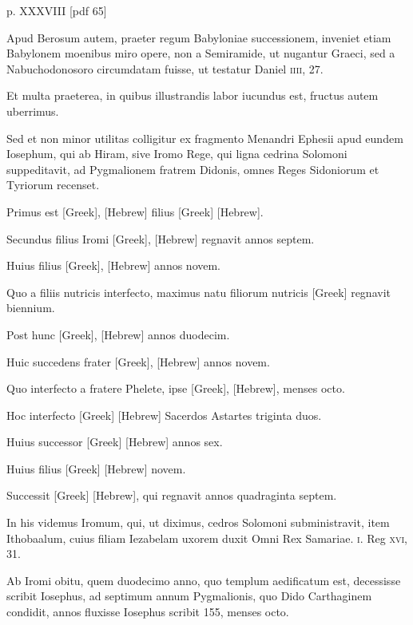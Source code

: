 \begin{parnumbers}
\clearpage
p. XXXVIII [pdf 65]

Apud Berosum autem, praeter
regum Babyloniae successionem, inveniet etiam Babylonem moenibus
miro opere, non a Semiramide, ut nugantur Graeci, sed a Nabuchodonosoro
circumdatam fuisse, ut testatur Daniel \textsc{iiii}, 27.

Et
multa praeterea, in quibus illustrandis labor iucundus est, fructus
autem uberrimus.

Sed et non minor utilitas colligitur ex fragmento
Menandri Ephesii apud eundem Iosephum, qui ab Hiram, sive
Iromo Rege, qui ligna cedrina Solomoni suppeditavit, ad Pygmalionem
fratrem Didonis, omnes Reges Sidoniorum et Tyriorum
recenset.

Primus est \textgreek{[Greek]}, \texthebrew{[Hebrew]}
 filius \textgreek{[Greek]} \texthebrew{[Hebrew]}.

Secundus filius Iromi \textgreek{[Greek]}, \texthebrew{[Hebrew]}
 regnavit annos septem.

Huius filius \textgreek{[Greek]}, \texthebrew{[Hebrew]} annos novem.

Quo a filiis nutricis
interfecto, maximus natu filiorum nutricis \textgreek{[Greek]} regnavit
biennium.

Post hunc \textgreek{[Greek]}, \texthebrew{[Hebrew]} annos
duodecim.

Huic succedens frater \textgreek{[Greek]}, \texthebrew{[Hebrew]} annos novem.

Quo interfecto a fratere Phelete, ipse
 \textgreek{[Greek]}, \texthebrew{[Hebrew]}, menses octo.

Hoc interfecto \textgreek{[Greek]} \texthebrew{[Hebrew]}
 Sacerdos Astartes triginta
duos.

Huius successor \textgreek{[Greek]} \texthebrew{[Hebrew]} annos sex.

Huius filius
\textgreek{[Greek]} \texthebrew{[Hebrew]} novem.

Successit \textgreek{[Greek]} \texthebrew{[Hebrew]}, qui regnavit
annos quadraginta septem.

In his videmus Iromum, qui, ut
diximus, cedros Solomoni subministravit, item Ithobaalum, cuius
filiam Iezabelam uxorem duxit Omni Rex Samariae. \textsc{i}. Reg \textsc{xvi},
31.

Ab Iromi obitu, quem duodecimo anno, quo templum aedificatum
est, decessisse scribit Iosephus, ad septimum annum Pygmalionis,
quo Dido Carthaginem condidit, annos fluxisse Iosephus
scribit 155, menses octo.


\end{parnumbers}
